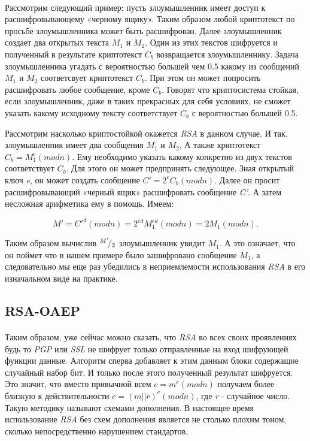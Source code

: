 \paragraph{} Рассмотрим следующий пример: пусть злоумышленник имеет доступ к расшифровывающему «черному ящику». Таким образом любой криптотекст по просьбе 
  злоумышленника может быть расшифрован. Далее злоумышленник создает два открытых текста {$M_1$} и {$M_2$}. 
  Один из этих текстов шифруется и полученный в результате криптотекст {$C_b$} возвращается злоумышленнику. Задача злоумышленника 
  угадать с вероятностью большей чем 0.5 какому из сообщений {$M_1$} и {$M_2$} соответсвует криптотекст 
  {$C_b$}. При этом он может попросить расшифровать любое сообщение, кроме {$C_b$}. Говорят что криптосистема 
  стойкая, если злоумышленник, даже в таких прекрасных для себя условиях, не сможет указать какому исходному тексту соответствует {$C_b$}
  с вероятностью большей 0.5.

  Рассмотрим насколько криптостойкой окажется \textit{RSA} в данном случае. И так, злоумышленник имеет два сообщения {$M_1$} и 
  {$M_2$}. А также криптотекст {$C_{b}=M^{e}_{1}(mod n)$}. Ему необходимо указать какому 
  конкретно из двух текстов соответствует {$C_b$}. Для этого он может предпринять следующее. Зная открытый ключ \textit{e}, он может 
  создать сообщение {$C'=2^{e} C_{b}(mod n)$}. Далее он просит расшифровывающий «черный ящик» расшифровать сообщение 
  \textit{C'}. А затем несложная арифметика ему в помощь. Имеем:

    \begin{equation}
      \textit{{$M'=C'^d(mod n)=2^{e d}M_{1}^{e d}(mod n)=2M_{1}(mod n).$}} 
    \end{equation}

  Таким образом вычислив {${}^{M'}\!/_{2}$} злоумышленник увидит {$M_1$}. А это означает, что он поймет что в нашем примере было зашифровано 
  сообщение {$M_1$}, а следовательно мы еще раз убедились в неприемлемости использования \textit{RSA} в его изначальном виде на практике.

\subsection{RSA-OAEP}

\paragraph{} Таким образом, уже сейчас можно сказать, что \textit{RSA} во всех своих проявлениях будь то \textit{PGP} или \textit{SSL} не шифрует только 
  отправленные на вход шифрующей функции данные. Алгоритм сперва добавляет к этим данным блоки содержащие случайный набор бит. И только после этого полученный
  результат шифруется. Это значит, что вместо привычной всем {$c=m^{e}(mod n)$} получаем более близкую к действительности 
  {$c=(m||r)^{e}(mod n)$}, где \textit{r} - случайное число. Такую методику называют схемами дополнения. В настоящее время использование
  \textit{RSA} без схем дополнения является не столько плохим тоном, сколько непосредственно нарушением стандартов.


